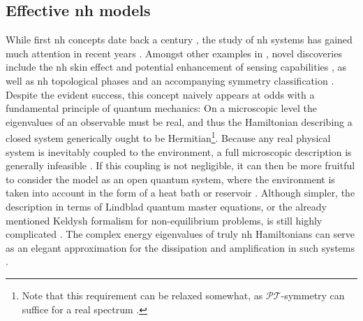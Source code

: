 \subsection{Effective \texorpdfstring{\acrlong{nh}}{NH} models}\label{sec:ep:motivation}
While first \gls{nh} concepts date back a century \cite{NH_Physics_review_Ashida_2020}, the study of \gls{nh} systems has gained much attention in recent years \cite{Emergent_NH_models_Eek_2024}.
Amongst other examples in \cite{ExceptTop_RevModPhys.93.015005,NH_Physics_review_Ashida_2020}, novel discoveries include the \gls{nh} skin effect \cite{NH_Topology_SkinEffect_Lin_2023} and potential enhancement of sensing capabilities \cite{NH_Topology_Sensors_Budich_2020}, as well as \gls{nh} topological phases \cite{NH_TopologicalPhases_Gong_2018} and an accompanying symmetry classification \cite{NHT_SymmetryClassification38_Kawabata_2019}.\\
Despite the evident success, this concept naively appears at odds with a fundamental principle of quantum mechanics:
On a microscopic level the eigenvalues of an observable must be real, and thus the Hamiltonian describing a closed system generically ought to be Hermitian\footnote{Note that this requirement can be relaxed somewhat, as $\mathcal{PT}$-symmetry can suffice for a real spectrum \cite{Hermiticity_PT_Symmetry_Bender_2003}.}.
Because any real physical system is inevitably coupled to the environment, a full microscopic description is generally infeasible \cite[]{OpenQuantumSystems_Breuer_2007}.
If this coupling is not negligible, it can then be more fruitful to consider the model as an open quantum system, where the environment is taken into account in the form of a heat bath or reservoir \cite[]{OpenQuantumSystems_Breuer_2007}.
Although simpler, the description in terms of Lindblad quantum master equations, or the already mentioned Keldysh formalism for non-equilibrium problems, is still highly complicated \cite{ExceptTop_RevModPhys.93.015005}.
The complex energy eigenvalues of truly \gls{nh} Hamiltonians can serve as an elegant approximation for the dissipation and amplification in such systems \cite{ExceptTop_RevModPhys.93.015005,NH_SkinEffect_QuasiParticles_NNint_Micallo_2023}.\\
